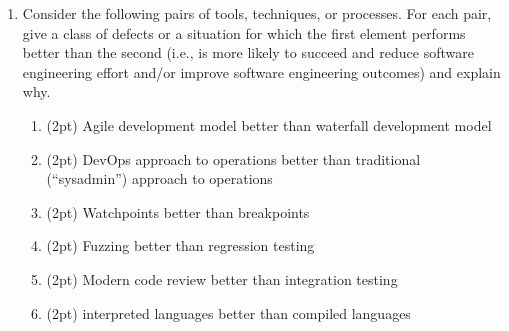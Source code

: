 \documentclass{report}
\newif\ifkey
\newcommand{\answerlong}[1]{\ifkey\color{red}\textbf{#1}\color{black}\else\vspace{0.5in}\fi\xspace}
\newcommand*{\pts}[1]{\addtocounter{points}{#1}(#1pt)}
\begin{document}
\begin{spacing}{1.4}
\begin{enumerate}[leftmargin=*]
    \item Consider the following pairs of tools, techniques, or processes. For each pair, give a class of defects or a
situation for which the first element performs better than the second (i.e., is more likely to succeed and reduce software
engineering effort and/or improve software engineering outcomes) and explain why.
\begin{enumerate}
\item \pts{2} Agile development model better than waterfall development model\\
  \answerlong{Agile is best when requirements are not fully known in advance and the customer is easy to access, because it relies on
    fast feedback cycles between your prototypes and the customer.}
\item \pts{2} DevOps approach to operations better than traditional (``sysadmin'') approach to operations\\
  \answerlong{DevOps is best when the organization developing a service is also running that service, becasue operational pain
    is felt by the same org.}
\item \pts{2} Watchpoints better than breakpoints \\
  \answerlong{Watchpoints are better when you know what value shouldn't be changing, but not where in the code that change is occuring.}
\item \pts{2} Fuzzing better than regression testing \\
  \answerlong{Fuzzing is better if the existing test suite is very small. Another reasonable answer is that fuzzing can find new bugs, but regression testing only prevents bug that have occurred before.}
\item \pts{2} Modern code review better than integration testing \\
  \answerlong{The easiest answer is that code review can find code-design defects, but integration testing cannot. Other answers are possible.}
\item \pts{2} interpreted languages better than compiled languages \\
  \answerlong{Interpreted languages are better for rapid prototyping and are usually easier to write code in.}
\end{enumerate}


\end{enumerate}
\end{spacing}
\end{document}
